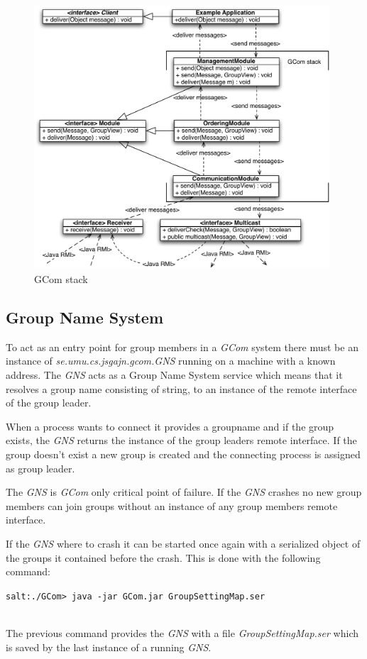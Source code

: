 \documentclass[titlepage, twocolumn, a4paper, 10pt]{article}
\begin{document}
\begin{figure}[!thb]
  \centerline{\includegraphics[width=110mm]{images/Stack.pdf}}
  \caption{GCom stack}
  \label{fig:images/Stack}
\end{figure}

\subsection{Group Name System}\label{sec:group-name-system}
To act as an entry point for group members in a \textit{GCom} system
there must be an instance of \textit{se.umu.cs.jsgajn.gcom.GNS}
running on a machine with a known address. The \textit{GNS} acts as a
Group Name System service which means that it resolves a group name
consisting of string, to an instance of the remote interface of the
group leader.

When a process wants to connect it provides a groupname and if
the group exists, the \textit{GNS} returns the instance of the group
leaders remote interface. If the group doesn't exist a new group is
created and the connecting process is assigned as group leader.

The \textit{GNS} is \textit{GCom} only critical point of failure. If
the \textit{GNS} crashes no new group members can join groups without
an instance of any group members remote interface.

If the \textit{GNS} where to crash it can be started once again with
a serialized object of the groups it contained before the crash. This
is done with the following command:\\
\begin{footnotesize}
  \verb!salt:./GCom> java -jar GCom.jar GroupSettingMap.ser!
\end{footnotesize}\\
The previous command provides the \textit{GNS} with a file
\textit{GroupSettingMap.ser} which is saved by the last instance of a
running \textit{GNS}.
\end{document}
